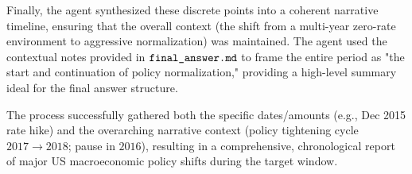 Finally, the agent synthesized these discrete points into a coherent narrative timeline, ensuring that the overall context (the shift from a multi-year zero-rate environment to aggressive normalization) was maintained. The agent used the contextual notes provided in $\text{\texttt{final\_answer.md}}$ to frame the entire period as "the start and continuation of policy normalization," providing a high-level summary ideal for the final answer structure.

The process successfully gathered both the specific dates/amounts (e.g., Dec 2015 rate hike) and the overarching narrative context (policy tightening cycle $2017 \rightarrow 2018$; pause in $2016$), resulting in a comprehensive, chronological report of major US macroeconomic policy shifts during the target window.
